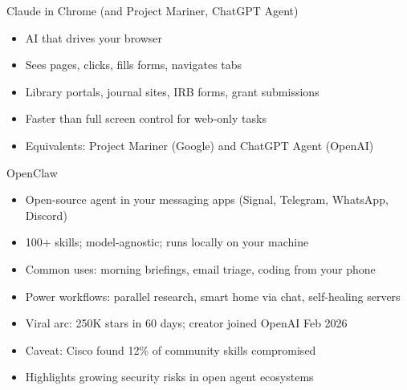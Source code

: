 \documentclass[aspectratio=169]{beamer}
\begin{document}
\begin{frame}{Claude in Chrome (and Project Mariner, ChatGPT Agent)}
    \begin{itemize}
        \item AI that drives your browser
        \vspace{0.4em}
        \item Sees pages, clicks, fills forms, navigates tabs
        \vspace{0.4em}
        \item Library portals, journal sites, IRB forms, grant submissions
        \vspace{0.4em}
        \item Faster than full screen control for web-only tasks
        \vspace{0.4em}
        \item Equivalents: Project Mariner (Google) and ChatGPT Agent (OpenAI)
    \end{itemize}
\end{frame}

\begin{frame}{OpenClaw}
    \begin{itemize}
        \item Open-source agent in your messaging apps (Signal, Telegram, WhatsApp, Discord)
        \vspace{0.4em}
        \item 100+ skills; model-agnostic; runs locally on your machine
        \vspace{0.4em}
        \item Common uses: morning briefings, email triage, coding from your phone
        \vspace{0.4em}
        \item Power workflows: parallel research, smart home via chat, self-healing servers
        \vspace{0.4em}
        \item Viral arc: 250K stars in 60 days; creator joined OpenAI Feb 2026
        \vspace{0.4em}
        \item Caveat: Cisco found 12\% of community skills compromised
        \vspace{0.4em}
        \item Highlights growing security risks in open agent ecosystems
    \end{itemize}
\end{frame}
\end{document}
